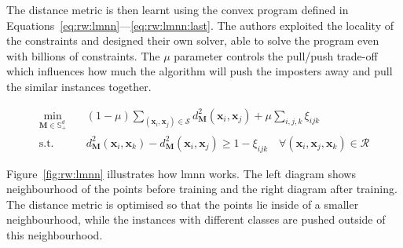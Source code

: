 The distance metric is then learnt using the convex program defined in Equations~\ref{eq:rw:lmnn}---\ref{eq:rw:lmnn:last}. The authors exploited the locality of the constraints and designed their own solver, able to solve the program even with billions of constraints. The $\mu$ parameter controls the pull/push trade-off which influences how much the algorithm will push the imposters away and pull the similar instances together.

\begin{align}
\min_{\bm{M} \in \mathbb{S}^{d}_+} \quad & (1-\mu)\sum_{(\bm{x}_i,\bm{x}_j)\in \mathcal{S}} d_{\bm{M}}^2(\bm{x}_i,\bm{x}_j) + \mu \sum_{i,j,k} \xi_{ijk} \label{eq:rw:lmnn} \\
\text{s.t.} \quad & d_{\bm{M}}^2(\bm{x}_i,\bm{x}_k) - d_{\bm{M}}^2(\bm{x}_i,\bm{x}_j) \geq 1 - \xi_{ijk} \quad \forall(\bm{x}_i,\bm{x}_j,\bm{x}_k) \in \mathcal{R} \label{eq:rw:lmnn:last}
\end{align}

Figure~\ref{fig:rw:lmnn} illustrates how \ac{lmnn} works. The left diagram shows neighbourhood of the points before training and the right diagram after training. The distance metric is optimised so that the points lie inside of a smaller neighbourhood, while the instances with different classes are pushed outside of this neighbourhood.






